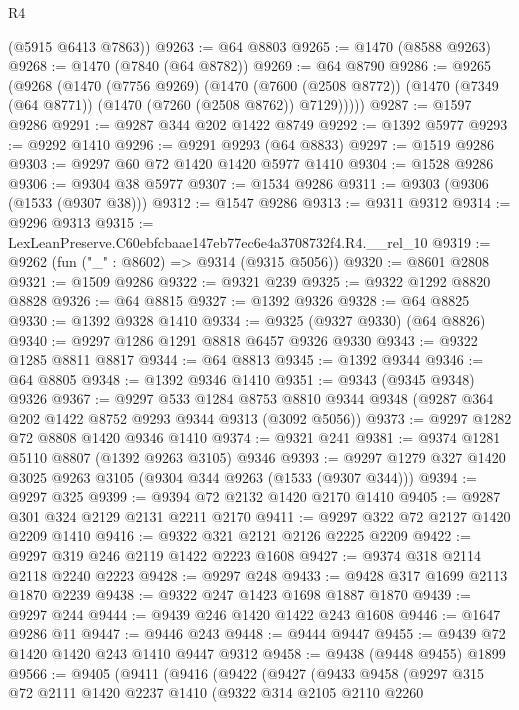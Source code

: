 \begin{lexlean}{R4}
\begin{coremodule}
      (@5915 @6413 @7863))
@9263 := @64 @8803
@9265 := @1470 (@8588 @9263)
@9268 := @1470 (@7840 (@64 @8782))
@9269 := @64 @8790
@9286 := @9265
    (@9268
      (@1470
        (@7756 @9269)
        (@1470
          (@7600 (@2508 @8772))
          (@1470 (@7349 (@64 @8771)) (@1470 (@7260 (@2508 @8762)) @7129)))))
@9287 := @1597 @9286
@9291 := @9287 @344 @202 @1422 @8749
@9292 := @1392 @5977
@9293 := @9292 @1410
@9296 := @9291 @9293 (@64 @8833)
@9297 := @1519 @9286
@9303 := @9297 @60 @72 @1420 @1420 @5977 @1410
@9304 := @1528 @9286
@9306 := @9304 @38 @5977
@9307 := @1534 @9286
@9311 := @9303 (@9306 (@1533 (@9307 @38)))
@9312 := @1547 @9286
@9313 := @9311 @9312
@9314 := @9296 @9313
@9315 := LexLeanPreserve.C60ebfcbaae147eb77ec6e4a3708732f4.R4.__rel_10
@9319 := @9262 (fun ("_" : @8602) => @9314 (@9315 @5056))
@9320 := @8601 @2808
@9321 := @1509 @9286
@9322 := @9321 @239
@9325 := @9322 @1292 @8820 @8828
@9326 := @64 @8815
@9327 := @1392 @9326
@9328 := @64 @8825
@9330 := @1392 @9328 @1410
@9334 := @9325 (@9327 @9330) (@64 @8826)
@9340 := @9297 @1286 @1291 @8818 @6457 @9326 @9330
@9343 := @9322 @1285 @8811 @8817
@9344 := @64 @8813
@9345 := @1392 @9344
@9346 := @64 @8805
@9348 := @1392 @9346 @1410
@9351 := @9343 (@9345 @9348) @9326
@9367 := @9297
    @533
    @1284
    @8753
    @8810
    @9344
    @9348
    (@9287 @364 @202 @1422 @8752 @9293 @9344 @9313 (@3092 @5056))
@9373 := @9297 @1282 @72 @8808 @1420 @9346 @1410
@9374 := @9321 @241
@9381 := @9374 @1281 @5110 @8807 (@1392 @9263 @3105) @9346
@9393 := @9297 @1279 @327 @1420 @3025 @9263 @3105 (@9304 @344 @9263 (@1533 (@9307 @344)))
@9394 := @9297 @325
@9399 := @9394 @72 @2132 @1420 @2170 @1410
@9405 := @9287 @301 @324 @2129 @2131 @2211 @2170
@9411 := @9297 @322 @72 @2127 @1420 @2209 @1410
@9416 := @9322 @321 @2121 @2126 @2225 @2209
@9422 := @9297 @319 @246 @2119 @1422 @2223 @1608
@9427 := @9374 @318 @2114 @2118 @2240 @2223
@9428 := @9297 @248
@9433 := @9428 @317 @1699 @2113 @1870 @2239
@9438 := @9322 @247 @1423 @1698 @1887 @1870
@9439 := @9297 @244
@9444 := @9439 @246 @1420 @1422 @243 @1608
@9446 := @1647 @9286 @11
@9447 := @9446 @243
@9448 := @9444 @9447
@9455 := @9439 @72 @1420 @1420 @243 @1410 @9447 @9312
@9458 := @9438 (@9448 @9455) @1899
@9566 := @9405
    (@9411
      (@9416
        (@9422
          (@9427
            (@9433
              @9458
              (@9297
                @315
                @72
                @2111
                @1420
                @2237
                @1410
                (@9322
                  @314
                  @2105
                  @2110
                  @2260

\end{coremodule}
\end{lexlean}
